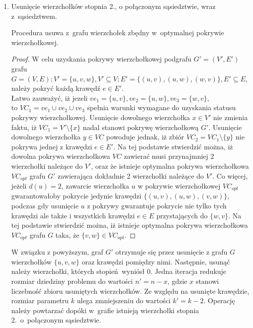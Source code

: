 \begin{enumerate}
  \item Usunięcie wierzchołków stopnia 2., o połączonym sąsiedztwie, wraz 
    z~sąsiedztwem.   
    \begin{theorem}
      Procedura usuwa z~grafu wierzchołek zbędny w~optymalnej pokrywie
      wierzchołkowej.
    \end{theorem}
    \begin{proof}
      W celu uzyskania pokrywy wierzchołkowej podgrafu $G\prime=(V\prime,E\prime)$
      grafu ${G=(V,E); V\prime=\{u, v, w\}, V\prime \subseteq V; E\prime=\{(u,v),
      (u,w), (w,v)\}, E\prime \subseteq E}$, należy pokryć każdą krawędź $e \in
      E\prime$.\\ 
      Łatwo zauważyć, iż jezeli ${ve_1=\{u,v\}, ve_2=\{u,w\}, ve_3=\{w,v\}}$,\\ 
      to ${VC_1=ve_1 \cup ve_2 \cup ve_3}$ spełnia warunki wymagane do uzyskania 
      statusu pokrywy wierzchołkowej.
      Usunięcie dowolnego wierzchołka $x \in V\prime$ nie zmienia faktu, iż 
      ${VC_1=V\prime \setminus \{x\}}$ nadal stanowi pokrywę wierzchołkową
      $G\prime$.
      Usunięcie dowolnego wierzchołka $y \in VC$ powoduje jednak, iż zbiór
      $VC_2=VC_1 \setminus \{y\}$ nie pokrywa jednej z krawędzi $e \in E\prime$.
      Na tej podstawie stwierdzić można, iż dowolna pokrywa wierzchołkowa
      $VC$ zawierać musi przynajmniej 2 wierzchołki należące do $V\prime$, oraz
      że istnieje optymalna pokrywa wierzchołkowa $VC_{opt}$ grafu $G\prime$
      zawierająca dokładnie 2 wierzchołki należące do $V\prime$.
      Co więcej, jeżeli $d(u)=2$, zawarcie wierzchołka $u$ w pokrywie
      wierzchołkowej $VC_{opt}$ gwarantowałoby pokrycie jedynie krawędzi
      $\{(u,v), (u,w), (v,w)\}$, podczas gdy usunięcie $u$ z pokrywy gwarantuje 
      pokrycie nie tylko tych krawędzi ale także i wszystkich krawędzi $e \in E$
      przystających do $\{w, v\}$.
      Na tej podstawie stwierdzić można, iż istnieje optymalna pokrywa
      wierzchołkowa $VC_{opt}$ grafu $G$ taka, że $\{v,w\} \in VC_{opt}$.
    \end{proof}
    W związku z powyższym, graf $G\prime$ otrzymuje się przez usunięcie z grafu
    $G$ wierzchołków $\{u,v,w\}$ oraz krawędzi pomiędzy nimi.
    Następnie, usunąć należy wierzchołki, których stopień wyniósł 0.
    Jedna iteracja redukuje rozmiar dziedziny problemu do wartości
    $n\prime=n-x$, gdzie $x$ stanowi liczebność zbioru usuniętych wierzchołków.
    Ze względu na usunięte krawędzie, rozmiar parametru $k$ ulega zmniejszeniu 
    do wartości $k\prime=k-2$.
    Operację należy powtarzać dopóki w~grafie istnieją wierzchołki stopnia 2.\
    o~połączonym sąsiedztwie.


\end{enumerate}
